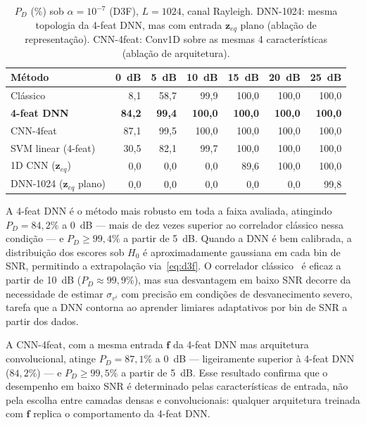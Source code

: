 \documentclass{sbrt}
\begin{document}
\begin{table}[htb]
\caption{\label{tab:resultados}$P_D$ (\%) sob $\alpha = 10^{-7}$ (D3F), $L=1024$, canal Rayleigh. DNN-1024: mesma topologia da 4-feat DNN, mas com entrada $\mathbf{z}_{eq}$ plano (ablação de representação). CNN-4feat: Conv1D sobre as mesmas 4 características (ablação de arquitetura).}
\begin{center}
\begin{tabular}{lrrrrrr}\toprule
Método & 0~dB & 5~dB & 10~dB & 15~dB & 20~dB & 25~dB \\\midrule
Clássico~\cite{ref_xie}          &  8{,}1 & 58{,}7 & 99{,}9 & 100{,}0 & 100{,}0 & 100{,}0 \\
\textbf{4-feat DNN}               & \textbf{84{,}2} & \textbf{99{,}4} & \textbf{100{,}0} & \textbf{100{,}0} & \textbf{100{,}0} & \textbf{100{,}0} \\
CNN-4feat                         & 87{,}1 & 99{,}5 & 100{,}0 & 100{,}0 & 100{,}0 & 100{,}0 \\
SVM linear (4-feat)               & 30{,}5 & 82{,}1 & 99{,}7 & 100{,}0 & 100{,}0 & 100{,}0 \\
1D CNN ($\mathbf{z}_{eq}$)~\cite{ref_liao} &  0{,}0 &  0{,}0 &  0{,}0 &  89{,}6 & 100{,}0 & 100{,}0 \\
DNN-1024 ($\mathbf{z}_{eq}$ plano) &  0{,}0 &  0{,}0 &  0{,}0 &   0{,}0 &   0{,}0 &  99{,}8 \\\bottomrule
\end{tabular}
\end{center}
\end{table}

A 4-feat DNN é o método mais robusto em toda a faixa avaliada, atingindo $P_D = 84{,}2\%$ a 0~dB — mais de dez vezes superior ao correlador clássico nessa condição — e $P_D \geq 99{,}4\%$ a partir de 5~dB. Quando a DNN é bem calibrada, a distribuição dos escores sob $H_0$ é aproximadamente gaussiana em cada bin de SNR, permitindo a extrapolação via~\eqref{eq:d3f}. O correlador clássico~\cite{ref_xie} é eficaz a partir de 10~dB ($P_D \approx 99{,}9\%$), mas sua desvantagem em baixo SNR decorre da necessidade de estimar $\sigma_{v^i}$ com precisão em condições de desvanecimento severo, tarefa que a DNN contorna ao aprender limiares adaptativos por bin de SNR a partir dos dados.

A CNN-4feat, com a mesma entrada $\mathbf{f}$ da 4-feat DNN mas arquitetura convolucional, atinge $P_D = 87{,}1\%$ a 0~dB — ligeiramente superior à 4-feat DNN ($84{,}2\%$) — e $P_D \geq 99{,}5\%$ a partir de 5~dB. Esse resultado confirma que o desempenho em baixo SNR é determinado pelas características de entrada, não pela escolha entre camadas densas e convolucionais: qualquer arquitetura treinada com $\mathbf{f}$ replica o comportamento da 4-feat DNN.
\end{document}
